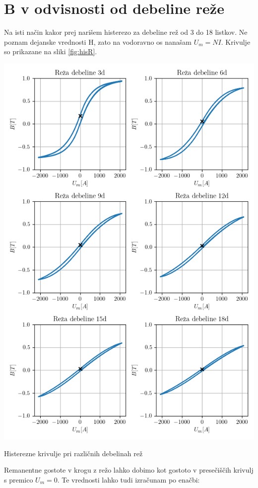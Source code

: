 \documentclass[12pt]{report}
\begin{document}
\section*{B v odvisnosti od debeline reže}

Na isti način kakor prej narišem histerezo za debeline rež od 3 do 18 listkov. Ne poznam dejanske vrednosti H, zato na vodoravno os nanašam $U_m =N I$. Krivulje so prikazane na sliki \ref{fig:hisR}.

\begin{slika}[H]
  \centering
  \includegraphics{grafi}
  \caption{\small Histerezne krivulje pri različnih debelinah rež}
  \label{fig:hisR}
\end{slika}

Remanentne gostote v krogu z režo lahko dobimo kot gostoto v presečiščih krivulj s premico $U_m = 0$. Te vrednosti lahko tudi izračunam po enačbi: 
\end{document}
